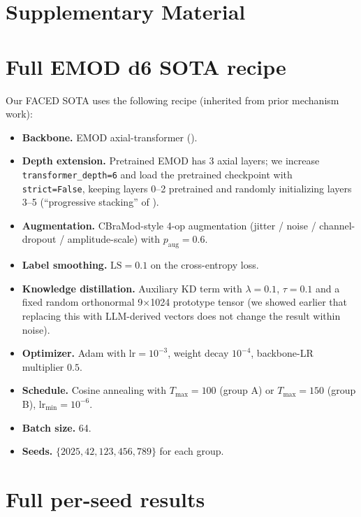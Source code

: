 \section*{Supplementary Material}
\renewcommand{\thesection}{S\arabic{section}}
\setcounter{section}{0}

\section{Full EMOD d6 SOTA recipe}
\label{sup:emod_recipe}

Our FACED SOTA uses the following recipe (inherited from prior mechanism work):
\begin{itemize}[leftmargin=*]
\item \textbf{Backbone.} EMOD axial-transformer (\cite{chen2026emod}).
\item \textbf{Depth extension.} Pretrained EMOD has 3 axial layers; we
increase \texttt{transformer\_depth=6} and load the pretrained checkpoint
with \texttt{strict=False}, keeping layers 0--2 pretrained and randomly
initializing layers 3--5 (``progressive stacking'' of
\cite{gong2024progressive}).
\item \textbf{Augmentation.} CBraMod-style 4-op augmentation
(jitter / noise / channel-dropout / amplitude-scale) with $p_\mathrm{aug}=0.6$.
\item \textbf{Label smoothing.} $\mathrm{LS}=0.1$ on the cross-entropy loss.
\item \textbf{Knowledge distillation.} Auxiliary KD term with $\lambda=0.1$,
$\tau=0.1$ and a fixed random orthonormal 9$\times$1024 prototype tensor
(we showed earlier that replacing this with LLM-derived vectors does not
change the result within noise).
\item \textbf{Optimizer.} Adam with $\mathrm{lr}=10^{-3}$, weight decay
$10^{-4}$, backbone-LR multiplier $0.5$.
\item \textbf{Schedule.} Cosine annealing with $T_\mathrm{max}=100$ (group A)
or $T_\mathrm{max}=150$ (group B), $\mathrm{lr}_{\mathrm{min}}=10^{-6}$.
\item \textbf{Batch size.} 64.
\item \textbf{Seeds.} $\{2025, 42, 123, 456, 789\}$ for each group.
\end{itemize}

\section{Full per-seed results}
\label{sup:per_seed}

